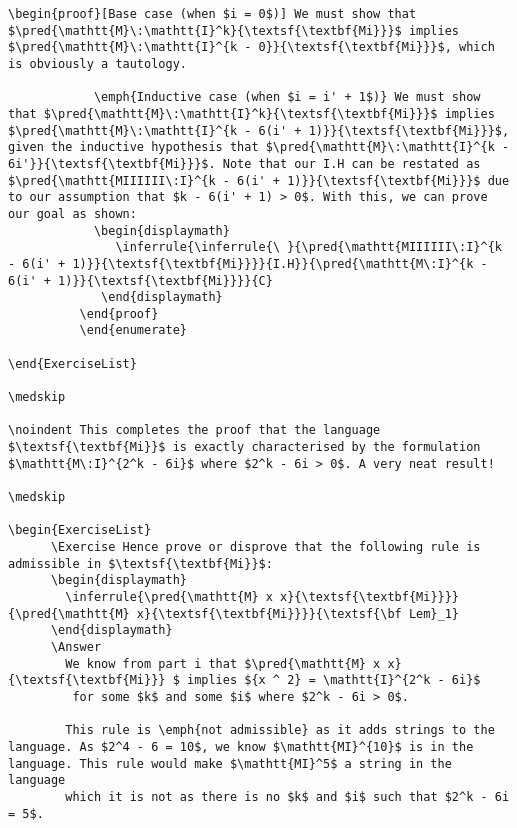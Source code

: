 \documentclass{book}
\begin{document}
\begin{verbatim}
\begin{proof}[Base case (when $i = 0$)] We must show that $\pred{\mathtt{M}\:\mathtt{I}^k}{\textsf{\textbf{Mi}}}$ implies $\pred{\mathtt{M}\:\mathtt{I}^{k - 0}}{\textsf{\textbf{Mi}}}$, which is obviously a tautology.
            
            \emph{Inductive case (when $i = i' + 1$)} We must show that $\pred{\mathtt{M}\:\mathtt{I}^k}{\textsf{\textbf{Mi}}}$ implies $\pred{\mathtt{M}\:\mathtt{I}^{k - 6(i' + 1)}}{\textsf{\textbf{Mi}}}$, given the inductive hypothesis that $\pred{\mathtt{M}\:\mathtt{I}^{k - 6i'}}{\textsf{\textbf{Mi}}}$. Note that our I.H can be restated as $\pred{\mathtt{MIIIIII\:I}^{k - 6(i' + 1)}}{\textsf{\textbf{Mi}}}$ due to our assumption that $k - 6(i' + 1) > 0$. With this, we can prove our goal as shown:
            \begin{displaymath}
               \inferrule{\inferrule{\ }{\pred{\mathtt{MIIIIII\:I}^{k - 6(i' + 1)}}{\textsf{\textbf{Mi}}}}{I.H}}{\pred{\mathtt{M\:I}^{k - 6(i' + 1)}}{\textsf{\textbf{Mi}}}}{C}
             \end{displaymath}
          \end{proof}
          \end{enumerate}
      
\end{ExerciseList}      

\medskip

\noindent This completes the proof that the language $\textsf{\textbf{Mi}}$ is exactly characterised by the formulation $\mathtt{M\:I}^{2^k - 6i}$ where $2^k - 6i > 0$. A very neat result!

\medskip

\begin{ExerciseList}
      \Exercise Hence prove or disprove that the following rule is admissible in $\textsf{\textbf{Mi}}$:
      \begin{displaymath}
        \inferrule{\pred{\mathtt{M} x x}{\textsf{\textbf{Mi}}}}{\pred{\mathtt{M} x}{\textsf{\textbf{Mi}}}}{\textsf{\bf Lem}_1}
      \end{displaymath}
      \Answer
        We know from part i that $\pred{\mathtt{M} x x}{\textsf{\textbf{Mi}}} $ implies ${x ^ 2} = \mathtt{I}^{2^k - 6i}$
         for some $k$ and some $i$ where $2^k - 6i > 0$.

        This rule is \emph{not admissible} as it adds strings to the language. As $2^4 - 6 = 10$, we know $\mathtt{MI}^{10}$ is in the language. This rule would make $\mathtt{MI}^5$ a string in the language
        which it is not as there is no $k$ and $i$ such that $2^k - 6i = 5$.


\end{verbatim}
\end{document}

